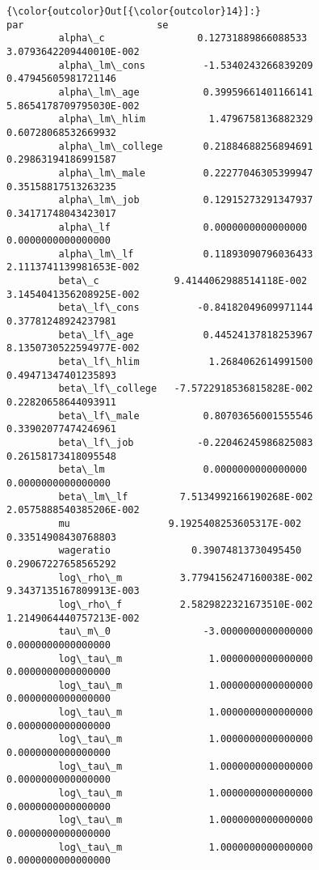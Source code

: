 \documentclass[11pt]{article}
\begin{document}
\begin{Verbatim}[commandchars=\\\{\}]
{\color{outcolor}Out[{\color{outcolor}14}]:}                                        par                       se
         alpha\_c                0.12731889866088533  3.0793642209440010E-002
         alpha\_lm\_cons          -1.5340243266839209      0.47945605981721146
         alpha\_lm\_age           0.39959661401166141  5.8654178709795030E-002
         alpha\_lm\_hlim           1.4796758136882329      0.60728068532669932
         alpha\_lm\_college       0.21884688256894691      0.29863194186991587
         alpha\_lm\_male          0.22277046305399947      0.35158817513263235
         alpha\_lm\_job           0.12915273291347937      0.34171748043423017
         alpha\_lf                0.0000000000000000       0.0000000000000000
         alpha\_lm\_lf            0.11893090796036433  2.1113741139981653E-002
         beta\_c             9.4144062988514118E-002  3.1454041356208925E-002
         beta\_lf\_cons          -0.84182049609971144      0.37781248924237981
         beta\_lf\_age            0.44524137818253967  8.1350730522594977E-002
         beta\_lf\_hlim            1.2684062614991500      0.49471347401235893
         beta\_lf\_college   -7.5722918536815828E-002      0.22820658644093911
         beta\_lf\_male           0.80703656001555546      0.33902077474246961
         beta\_lf\_job           -0.22046245986825083      0.26158173418095548
         beta\_lm                 0.0000000000000000       0.0000000000000000
         beta\_lm\_lf         7.5134992166190268E-002  2.0575888540385206E-002
         mu                 9.1925408253605317E-002      0.33514908430768803
         wageratio              0.39074813730495450      0.29067227658565292
         log\_rho\_m          3.7794156247160038E-002  9.3437135167809913E-003
         log\_rho\_f          2.5829822321673510E-002  1.2149064440757213E-002
         tau\_m\_0                -3.0000000000000000       0.0000000000000000
         log\_tau\_m               1.0000000000000000       0.0000000000000000
         log\_tau\_m               1.0000000000000000       0.0000000000000000
         log\_tau\_m               1.0000000000000000       0.0000000000000000
         log\_tau\_m               1.0000000000000000       0.0000000000000000
         log\_tau\_m               1.0000000000000000       0.0000000000000000
         log\_tau\_m               1.0000000000000000       0.0000000000000000
         log\_tau\_m               1.0000000000000000       0.0000000000000000
         log\_tau\_m               1.0000000000000000       0.0000000000000000

\end{Verbatim}
\end{document}
